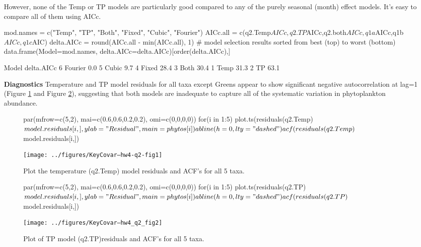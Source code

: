 However, none of the Temp or TP models are particularly good compared to any of the
purely seasonal (month) effect models. It's easy to compare all of them using AICc.
\begin{Schunk}
\begin{Sinput}
 mod.names = c("Temp", "TP", "Both", "Fixed", "Cubic", "Fourier")
 AICc.all = c(q2.Temp$AICc,q2.TP$AICc,q2.both$AICc,q1a$AICc,q1b$AICc,q1c$AIC)
 delta.AICc = round(AICc.all - min(AICc.all), 1)
 # model selection results sorted from best (top) to worst (bottom)
 data.frame(Model=mod.names, delta.AICc=delta.AICc)[order(delta.AICc),]
\end{Sinput}
\begin{Soutput}
    Model delta.AICc
6 Fourier        0.0
5   Cubic        9.7
4   Fixed       28.4
3    Both       30.4
1    Temp       31.3
2      TP       63.1
\end{Soutput}
\end{Schunk}


{\bf Diagnostics} Temperature and TP model residuals for all taxa except Greens appear to show significant negative
autocorrelation at lag=1 (Figure \ref{fig:q2a.diagnostics} and Figure \ref{fig:q2b.diagnostics}), suggesting that both models are inadequate to
capture all of the systematic variation in phytoplankton abundance.

\begin{figure}[htp]
\label{fig:q2a.diagnostics}
\begin{center}
\begin{Schunk}
\begin{Sinput}
 par(mfrow=c(5,2), mai=c(0.6,0.6,0.2,0.2), omi=c(0,0,0,0))
 for(i in 1:5) {
   plot.ts(residuals(q2.Temp)$model.residuals[i,], ylab="Residual", main=phytos[i])
 	abline(h=0, lty="dashed")
 	acf(residuals(q2.Temp)$model.residuals[i,])
 	}
\end{Sinput}
\end{Schunk}
\texttt{[image: ../figures/KeyCovar--hw4-q2-fig1]}
\end{center}
\caption{Plot the temperature (q2.Temp) model residuals and ACF's for all 5 taxa.}
\end{figure}

\begin{figure}[htp]
\label{fig:q2b.diagnostics}
\begin{center}
\begin{Schunk}
\begin{Sinput}
 par(mfrow=c(5,2), mai=c(0.6,0.6,0.2,0.2), omi=c(0,0,0,0))
 for(i in 1:5) {
 	plot.ts(residuals(q2.TP)$model.residuals[i,], ylab="Residual", main=phytos[i])
 	abline(h=0, lty="dashed")
 	acf(residuals(q2.TP)$model.residuals[i,])
 	}
\end{Sinput}
\end{Schunk}
\texttt{[image: ../figures/KeyCovar--hw4\_q2\_fig2]}
\end{center}
\caption{Plot of TP model (q2.TP)residuals and ACF's for all 5 taxa.}
\end{figure}

